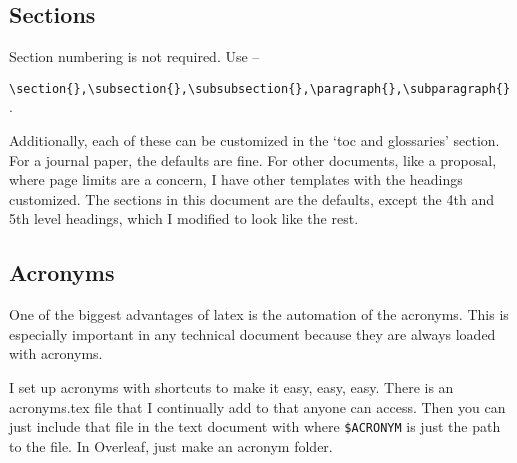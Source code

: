 \documentclass[11pt,a4paper]{article}
\begin{document}
\subsection{Sections}
Section numbering is not required. Use -- 

\verb=\section{},\subsection{},\subsubsection{},\paragraph{},\subparagraph{}=. 

Additionally, each of these can be customized in the `toc and glossaries' section. For a journal paper, the defaults are fine. For other documents, like a proposal, where page limits are a concern, I have other templates with the headings customized. The sections in this document are the defaults, except the 4th and 5th level headings, which I modified to look like the rest. 


\subsection{Acronyms}
One of the biggest advantages of latex is the automation of the acronyms. This is especially important in any technical document because they are always loaded with acronyms.

I set up acronyms with shortcuts to make it easy, easy, easy. There is an acronyms.tex file that I continually add to that anyone can access. Then you can just include that file in the text document with \verb== where \verb=$ACRONYM= is just the path to the file. In Overleaf, just make an acronym folder. 
\end{document}
